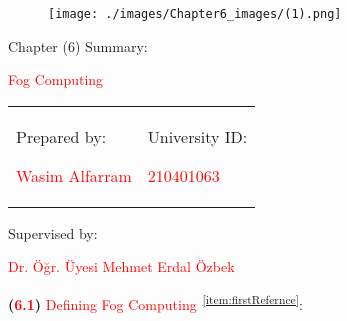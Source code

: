 \documentclass[11pt]{article}
\begin{document}
\newpage

\vspace{2\baselineskip}
\begin{figure}[H]
\centering
\texttt{[image: ./images/Chapter6\_images/(1).png]}
\end{figure}

\vspace{2\baselineskip}
\begin{center}
{\huge Chapter (6) Summary:}
\end{center}

\begin{center}
{\huge \textcolor[HTML]{FF0000}{Fog Computing}}
\end{center}

\begin{table}[H]
\begin{adjustbox}{max width=\textwidth}
\begin{tabular}{p{7.32cm}p{7.32cm}}
\multicolumn{1}{p{7.32cm}}{

\begin{center}
{\huge Prepared by:}
\end{center}

\centering
{\huge \textcolor[HTML]{FF0000}{Wasim Alfarram}}} & 
\multicolumn{1}{p{7.32cm}}{

\begin{center}
{\huge University ID:}
\end{center}

\centering
{\huge \textcolor[HTML]{FF0000}{210401063}}}
\end{tabular}
\end{adjustbox}
\end{table}

\vspace{2\baselineskip}
\begin{center}
{\huge Supervised by:}
\end{center}

\begin{center}
{\huge \textcolor[HTML]{FF0000}{Dr. Öğr. Üyesi Mehmet Erdal Özbek}}
\end{center}



\newpage

{\LARGE \textbf{(\textcolor[HTML]{FF0000}{6.1})} \textcolor[HTML]{FF0000}{Defining Fog Computing\textsuperscript{}\textsuperscript{}}\textsuperscript{\textcolor[HTML]{0070C0}{~\ref{item:firstRefernce}}}:}
\end{document}

